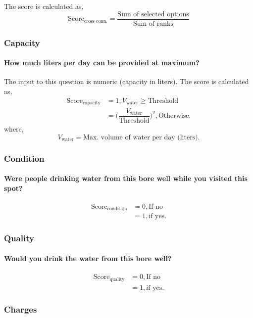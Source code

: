 \documentclass[oneside,twocolumn]{article}
\newcommand{\tsub}[2]{\text{#1}_{\text{#2}}}
\newcommand{\tsubb}[2]{#1_{\text{#2}}}
\newcommand{\dsub}[2]{\dfrac{\text{#1}}{\text{#2}}}
\begin{document}
The score is calculated as,
\[
	\tsub{Score}{cross conn.} = \dsub{Sum of selected options}{Sum of ranks}
\]

\subsubsection{Capacity}
\paragraph{How much liters per day can be provided at maximum?}
The input to this question is numeric (capacity in liters). The score is calculated as,
\begin{align*}
	\tsub{Score}{capacity} &= 1, \tsubb{V}{water} \ge \text{Threshold} \\
	&= \Big( \dfrac{\tsubb{V}{water}}{\text{Threshold}} \Big)^{2}, \text{Otherwise}.
\end{align*}
where,
\[
	\tsubb{V}{water} = \text{Max. volume of water per day (liters)}.
\]	
\subsubsection{Condition}
\paragraph{Were people drinking water from this bore well while you visited this spot?}
\begin{align*}
	\tsub{Score}{condition} &= 0, \text{If no} \\
	&= 1, \text{if yes}.
\end{align*}

\subsubsection{Quality}
\paragraph{Would you drink the water from this bore well?}
\begin{align*}
	\tsub{Score}{quality} &= 0, \text{If no} \\
	&= 1, \text{if yes}.
\end{align*}

\subsubsection{Charges}
\end{document}
